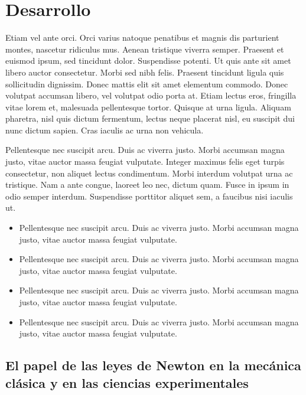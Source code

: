 \documentclass[12pt]{article}
\begin{document}
  
\section{Desarrollo}
Etiam vel ante orci. Orci varius natoque penatibus et magnis dis parturient montes, nascetur ridiculus mus. Aenean tristique viverra semper. Praesent et euismod ipsum, sed tincidunt dolor. Suspendisse potenti. Ut quis ante sit amet libero auctor consectetur. Morbi sed nibh felis. Praesent tincidunt ligula quis sollicitudin dignissim. Donec mattis elit sit amet elementum commodo. Donec volutpat accumsan libero, vel volutpat odio porta at. Etiam lectus eros, fringilla vitae lorem et, malesuada pellentesque tortor. Quisque at urna ligula. Aliquam pharetra, nisl quis dictum fermentum, lectus neque placerat nisl, eu suscipit dui nunc dictum sapien. Cras iaculis ac urna non vehicula.

\bigskip

Pellentesque nec suscipit arcu. Duis ac viverra justo. Morbi accumsan magna justo, vitae auctor massa feugiat vulputate. Integer maximus felis eget turpis consectetur, non aliquet lectus condimentum. Morbi interdum volutpat urna ac tristique. Nam a ante congue, laoreet leo nec, dictum quam. Fusce in ipsum in odio semper interdum. Suspendisse porttitor aliquet sem, a faucibus nisi iaculis ut. 

\bigskip

\begin{itemize}
    \item Pellentesque nec suscipit arcu. Duis ac viverra justo. Morbi accumsan magna justo, vitae auctor massa feugiat vulputate.
    \item Pellentesque nec suscipit arcu. Duis ac viverra justo. Morbi accumsan magna justo, vitae auctor massa feugiat vulputate.
    \item Pellentesque nec suscipit arcu. Duis ac viverra justo. Morbi accumsan magna justo, vitae auctor massa feugiat vulputate.
    \item Pellentesque nec suscipit arcu. Duis ac viverra justo. Morbi accumsan magna justo, vitae auctor massa feugiat vulputate.
\end{itemize}

\subsection{El papel de las leyes de Newton en la mecánica clásica y en las ciencias experimentales}
\end{document}
